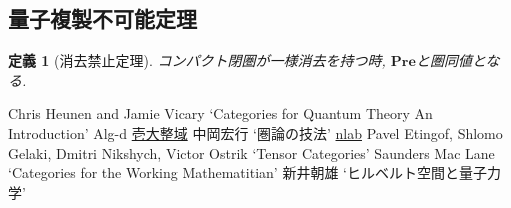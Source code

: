 \documentclass[a4paper,12pt]{ltjsarticle}
\theoremstyle{break}
\newtheorem{defn}[thm]{定義}
\newcommand{\pre}{\mathbf{Pre}}
\numberwithin{equation}{section}
\begin{document}
\subsection{量子複製不可能定理}

\begin{defn}[消去禁止定理]
  コンパクト閉圏が一様消去を持つ時, $\pre$と圏同値となる. 
\end{defn}


\newpage

\begin{thebibliography}{EGNO}
   Chris Heunen and Jamie Vicary `Categories for Quantum Theory An Introduction'
   Alg-d \href{http://alg-d.com/}{壱大整域}
   中岡宏行 `圏論の技法'
   \href{https://ncatlab.org/nlab/show/HomePage}{nlab}
   Pavel Etingof, Shlomo Gelaki, Dmitri Nikshych, Victor Ostrik `Tensor Categories'
   Saunders Mac Lane `Categories for the Working Mathematitian'
   新井朝雄 `ヒルベルト空間と量子力学'
\end{thebibliography}
\end{document}

